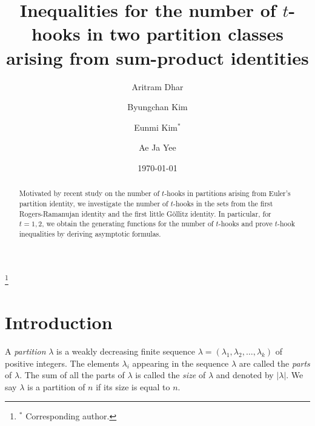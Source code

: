 \documentclass[11pt,reqno]{amsart}
\theoremstyle{remark}
\numberwithin{equation}{section}
\begin{document}
\title[Inequalities for $t$-hook numbers]{Inequalities for the number of $t$-hooks in two partition classes arising from sum-product identities}


\date{\today}

\author[A. Dhar]{Aritram Dhar}
\address{Department of Mathematics, University of Florida, Gainesville, FL 32601, USA}

\author[B. Kim]{Byungchan Kim}
\address{School of Natural Sciences, Seoul National University of Science and Technology, 232 Gongneung-ro, Nowon-gu, Seoul, 01811, Republic of Korea}


\author[E. Kim]{Eunmi Kim$^\ast$}
\address{Institute of Mathematical Sciences, Ewha Womans University, 52 Ewhayeodae-gil, Seodaemun-gu, Seoul 03760, Republic of Korea}
\thanks{$^\ast$ Corresponding author.}

\author[A.J. Yee]{Ae Ja Yee}
\address{Department of Mathematics, The Pennsylvania State University, University Park, PA 16802, USA}


\begin{abstract} 
Motivated by recent study on the number of $t$-hooks in partitions arising from Euler's partition identity, we investigate the number of $t$-hooks in the sets from the first Rogers-Ramanujan identity and the first little G\"ollitz identity. In particular, for $t=1,2$, we obtain the generating functions for the number of $t$-hooks and prove $t$-hook inequalities by deriving asymptotic formulas.
\end{abstract}


\maketitle

\section{Introduction}
A \textit{partition} $\lambda$ is a weakly decreasing finite sequence $\lambda = (\lambda_1,\lambda_2,\dots,\lambda_k)$ of positive integers. The elements $\lambda_i$ appearing in the sequence $\lambda$ are called the \textit{parts} of $\lambda$. The sum of all the parts of $\lambda$ is called the \textit{size} of $\lambda$ and denoted by $|\lambda|$. We say $\lambda$ is a partition of $n$ if its size is equal to $n$.
\end{document}
